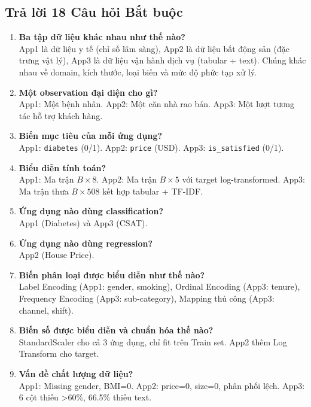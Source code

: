 \documentclass[12pt, a4paper]{article}
\begin{document}
\subsection{Trả lời 18 Câu hỏi Bắt buộc}

\begin{enumerate}
    \item \textbf{Ba tập dữ liệu khác nhau như thế nào?} \\
    App1 là dữ liệu y tế (chỉ số lâm sàng), App2 là dữ liệu bất động sản (đặc trưng vật lý), App3 là dữ liệu vận hành dịch vụ (tabular + text). Chúng khác nhau về domain, kích thước, loại biến và mức độ phức tạp xử lý.

    \item \textbf{Một observation đại diện cho gì?} \\
    App1: Một bệnh nhân. App2: Một căn nhà rao bán. App3: Một lượt tương tác hỗ trợ khách hàng.

    \item \textbf{Biến mục tiêu của mỗi ứng dụng?} \\
    App1: \texttt{diabetes} (0/1). App2: \texttt{price} (USD). App3: \texttt{is\_satisfied} (0/1).

    \item \textbf{Biểu diễn tính toán?} \\
    App1: Ma trận $B \times 8$. App2: Ma trận $B \times 5$ với target log-transformed. App3: Ma trận thưa $B \times 508$ kết hợp tabular + TF-IDF.

    \item \textbf{Ứng dụng nào dùng classification?} \\
    App1 (Diabetes) và App3 (CSAT).

    \item \textbf{Ứng dụng nào dùng regression?} \\
    App2 (House Price).

    \item \textbf{Biến phân loại được biểu diễn như thế nào?} \\
    Label Encoding (App1: gender, smoking), Ordinal Encoding (App3: tenure), Frequency Encoding (App3: sub-category), Mapping thủ công (App3: channel, shift).

    \item \textbf{Biến số được biểu diễn và chuẩn hóa thế nào?} \\
    StandardScaler cho cả 3 ứng dụng, chỉ fit trên Train set. App2 thêm Log Transform cho target.

    \item \textbf{Vấn đề chất lượng dữ liệu?} \\
    App1: Missing gender, BMI=0. App2: price=0, size=0, phân phối lệch. App3: 6 cột thiếu >60\%, 66.5\% thiếu text.


\end{enumerate}
\end{document}
